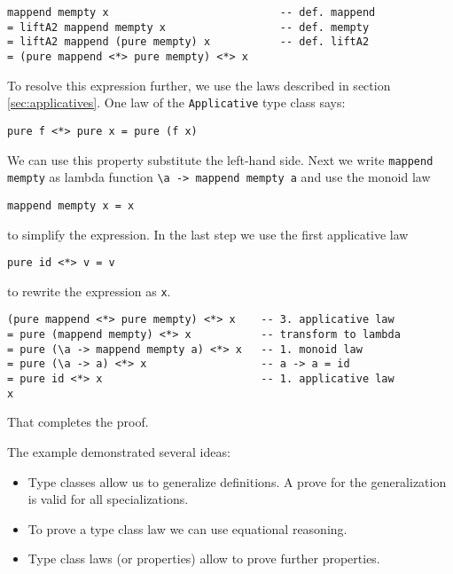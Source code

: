 \begin{verbatim}
mappend mempty x                           -- def. mappend
= liftA2 mappend mempty x                  -- def. mempty
= liftA2 mappend (pure mempty) x           -- def. liftA2
= (pure mappend <*> pure mempty) <*> x
\end{verbatim}

To resolve this expression further, we use the laws described in section \ref{sec:applicatives}.
One law of the \verb|Applicative| type class says:
\begin{verbatim}
pure f <*> pure x = pure (f x)
\end{verbatim}
We can use this property substitute the left-hand side. Next we write \verb|mappend mempty| as lambda function \verb|\a -> mappend mempty a| and use the monoid law
\begin{verbatim}
mappend mempty x = x
\end{verbatim}
to simplify the expression. In the last step we use the first applicative law
\begin{verbatim}
pure id <*> v = v
\end{verbatim}
 to rewrite the expression as \verb|x|.
\begin{verbatim}
(pure mappend <*> pure mempty) <*> x    -- 3. applicative law
= pure (mappend mempty) <*> x           -- transform to lambda
= pure (\a -> mappend mempty a) <*> x   -- 1. monoid law 
= pure (\a -> a) <*> x                  -- a -> a = id
= pure id <*> x                         -- 1. applicative law
x
\end{verbatim}

That completes the proof.

The example demonstrated several ideas:
\begin{itemize}
\item Type classes allow us to generalize definitions. A prove for the generalization is valid for all specializations.
\item To prove a type class law we can use equational reasoning.
\item Type class laws (or properties) allow to prove further properties.
\end{itemize}

